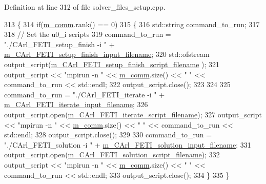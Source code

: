 Definition at line 312 of file solver\+\_\+files\+\_\+setup.\+cpp.


\begin{DoxyCode}
313 \{
314     \textcolor{keywordflow}{if}(\hyperlink{classcarl_1_1_solver___files___setup_aa8049195d5e383a0ca4295795e3f5751}{m\_comm}.rank() == 0)
315     \{
316         std::string command\_to\_run;
317 
318         \textcolor{comment}{// Set the u0\_i scripts}
319         command\_to\_run = \textcolor{stringliteral}{"./CArl\_FETI\_setup\_finish -i "} + 
      \hyperlink{classcarl_1_1_solver___files___setup_a24d691377ccdddf6fe29e3025bc53c13}{m\_CArl\_FETI\_setup\_finish\_input\_filename};
320         std::ofstream output\_script(\hyperlink{classcarl_1_1_solver___files___setup_a74f8cd1404471542269a1cc9aa8c8d84}{m\_CArl\_FETI\_setup\_finish\_script\_filename}
      );
321         output\_script << \textcolor{stringliteral}{"mpirun -n "} << \hyperlink{classcarl_1_1_solver___files___setup_aa8049195d5e383a0ca4295795e3f5751}{m\_comm}.size() << \textcolor{stringliteral}{" "} << command\_to\_run << std::endl;
322         output\_script.close();
323         
324         
325         command\_to\_run = \textcolor{stringliteral}{"./CArl\_FETI\_iterate -i "} + 
      \hyperlink{classcarl_1_1_solver___files___setup_a2e7e17a2974bf14101e4a2e37cc893fb}{m\_CArl\_FETI\_iterate\_input\_filename};
326         output\_script.open(\hyperlink{classcarl_1_1_solver___files___setup_a9ce875697a888d84dbd186f74e64cd6a}{m\_CArl\_FETI\_iterate\_script\_filename});
327         output\_script << \textcolor{stringliteral}{"mpirun -n "} << \hyperlink{classcarl_1_1_solver___files___setup_aa8049195d5e383a0ca4295795e3f5751}{m\_comm}.size() << \textcolor{stringliteral}{" "}  << command\_to\_run << std::endl;
328         output\_script.close();
329 
330         command\_to\_run = \textcolor{stringliteral}{"./CArl\_FETI\_solution -i "} + 
      \hyperlink{classcarl_1_1_solver___files___setup_affd2303fa7ca09f66e2ca07709cc422a}{m\_CArl\_FETI\_solution\_input\_filename};
331         output\_script.open(\hyperlink{classcarl_1_1_solver___files___setup_a147113a3a6de5fa59e4236adf08e16b2}{m\_CArl\_FETI\_solution\_script\_filename});
332         output\_script << \textcolor{stringliteral}{"mpirun -n "} << \hyperlink{classcarl_1_1_solver___files___setup_aa8049195d5e383a0ca4295795e3f5751}{m\_comm}.size() << \textcolor{stringliteral}{" "}  << command\_to\_run << std::endl;
333         output\_script.close();
334     \}
335 \}
\end{DoxyCode}
\hypertarget{classcarl_1_1_solver___files___setup_aa560da8b919addc4b70da138a5327ed7}{}
